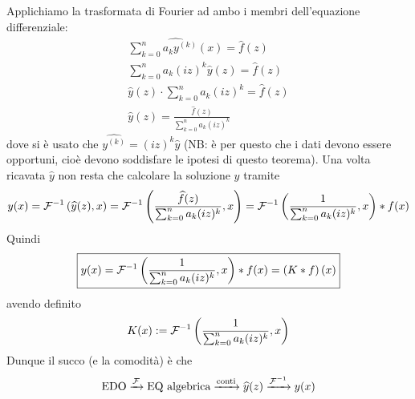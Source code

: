 Applichiamo la trasformata di Fourier ad ambo i membri dell'equazione differenziale:
\begin{gather*}
\hat{\sum_{k=0}^n a_ky^{(k)}(x)}=\hat{f}(z) \\
\sum_{k=0}^na_k(iz)^k\hat{y}(z)=\hat{f}(z) \\
\hat{y}(z)\cdot \sum_{k=0}^na_k(iz)^k=\hat{f}(z) \\
\boxed{\hat{y}(z)=\frac{\hat{f}(z)}{\sum_{k=0}^na_k(iz)^k}}
\end{gather*}
dove si è usato che $\hat{y^{(k)}}=(iz)^k\hat{y}$ (NB: è per questo che i dati devono essere opportuni, cioè devono soddisfare le ipotesi di questo teorema). Una volta ricavata $\hat{y}$ non resta che calcolare la soluzione $y$ tramite
\begin{equation*}
y(x)=\mathcal{F}^{-1}\left(\widehat{y}(z),x\right)=\mathcal{F}^{-1}\left(\frac{\widehat{f}(z)}{\sum_{k=0}^na_k(iz)^k},x\right)=\mathcal{F}^{-1}\left(\frac{1}{\sum_{k=0}^na_k(iz)^k},x\right)*f(x)
\end{equation*}
Quindi
\begin{equation*}
\boxed{y(x)=\mathcal{F}^{-1}\left(\frac{1}{\sum_{k=0}^na_k(iz)^k},x\right)*f(x)=\left(K*f\right)(x)}
\end{equation*}
avendo definito
\begin{equation*}
K(x):=\mathcal{F}^{-1}\left(\frac{1}{\sum_{k=0}^na_k(iz)^k},x\right)
\end{equation*}
Dunque il succo (e la comodità) è che
\begin{equation*}
\text{EDO}\xrightarrow[]{\mathcal{F}}\text{EQ algebrica}\xrightarrow[]{\text{conti}}\widehat{y}(z)\xrightarrow[]{\mathcal{F}^{-1}}  y(x)
\end{equation*}

